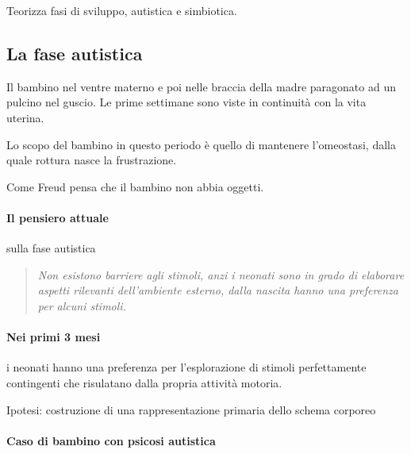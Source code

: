 \documentclass[12pt, a4paper]{article}
\begin{document}
Teorizza fasi di sviluppo, autistica e simbiotica.

\subsection{La fase autistica}

Il bambino nel ventre materno e poi nelle braccia della madre paragonato ad un pulcino nel guscio. Le prime settimane sono viste in continuit\`a con la vita uterina.

Lo scopo del bambino in questo periodo \`e quello di mantenere l'omeostasi, dalla quale rottura nasce la frustrazione.

Come Freud pensa che il bambino non abbia oggetti.

\paragraph{Il pensiero attuale} sulla fase autistica

\begin{quote}
    \emph{Non esistono barriere agli stimoli, anzi i neonati sono in grado di elaborare aspetti rilevanti dell'ambiente esterno, dalla nascita hanno una preferenza per alcuni stimoli.}
\end{quote}

\paragraph{Nei primi 3 mesi} i neonati hanno una preferenza per l'esplorazione di stimoli perfettamente contingenti che risulatano dalla propria attivit\`a motoria.

Ipotesi: costruzione di una rappresentazione primaria dello schema corporeo

\paragraph{Caso di bambino con psicosi autistica}
\end{document}
